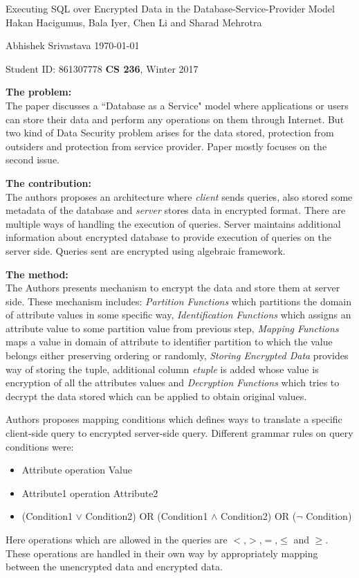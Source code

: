 \documentclass[a4paper,11pt, twoside]{article}
\renewcommand{\maketitle}{%
 	\Large
 	\begin{center}
 	Executing SQL over Encrypted Data in the Database-Service-Provider Model\\	
 	\normalsize Hakan Hacigumus, Bala Iyer, Chen Li and Sharad Mehrotra
 	\end{center}
 
 	\Large
	Abhishek Srivastava
	\hfill
	\normalsize
	\today
 	\par
 	Student ID: 861307778
 	\hfill
 	\textbf{CS 236}, Winter 2017
 	\par 	
 	\hrulefill
 	\par
 	}
\begin{document}
\thispagestyle{empty}
	
\maketitle
\textbf{The problem:}\\
The paper discusses a ``Database as a Service" model where applications or users can store their data and perform any operations on them through Internet. But two kind of Data Security problem arises for the data stored, protection from outsiders and protection from service provider. Paper mostly focuses on the second issue.   

\textbf{The contribution:}\\
The authors proposes an architecture where \emph{client} sends queries, also stored some metadata of the database and \emph{server} stores data in encrypted format. There are multiple ways of handling the execution of queries. Server maintains additional information about encrypted database to provide execution of queries on the server side. Queries sent are encrypted using algebraic framework.

\textbf{The method:}\\
The Authors presents mechanism to encrypt the data and store them at server side. These mechanism includes: \emph{Partition Functions} which partitions the domain of attribute values in some specific way, \emph{Identification Functions} which assigns an attribute value to some partition value from previous step, \emph{Mapping Functions} maps a value in domain of attribute to identifier partition to which the value belongs either preserving ordering or randomly, \emph{Storing Encrypted Data} provides way of storing the tuple, additional column \emph{etuple} is added whose value is encryption of all the attributes values and \emph{Decryption Functions} which tries to decrypt the data stored which can be applied to obtain original values.
 
Authors proposes mapping conditions which defines ways to translate a specific client-side query to encrypted server-side query. Different grammar rules on query conditions were:

\begin{itemize}
	\item Attribute operation Value
	\item Attribute1 operation Attribute2 
	\item (Condition1 $\vee$ Condition2) OR (Condition1 $\wedge$ Condition2) OR ($\neg$ Condition) 
\end{itemize}
Here operations which are allowed in the queries are $<$,$>$,$=$,$\leq$ and $\geq$. These operations are handled in their own way by appropriately mapping between the unencrypted data and encrypted data.
\end{document}
